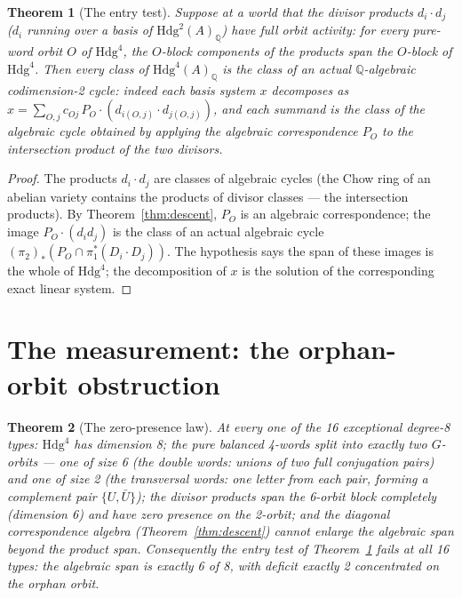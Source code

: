\documentclass[11pt]{article}
\newtheorem{theorem}{Theorem}
\begin{document}
\begin{theorem}[The entry test]\label{thm:entry}
Suppose at a world that the divisor products $d_i \cdot d_j$ ($d_i$ running over a basis of
$\mathrm{Hdg}^2(A)_\mathbb{Q}$) have \emph{full orbit activity}: for every pure-word orbit $O$
of $\mathrm{Hdg}^4$, the $O$-block components of the products span the $O$-block of
$\mathrm{Hdg}^4$.  Then every class of $\mathrm{Hdg}^4(A)_\mathbb{Q}$ is the class of an actual
$\mathbb{Q}$-algebraic codimension-2 cycle: indeed each basis system $x$ decomposes as
$x = \sum_{O,j} c_{Oj}\, P_O \cdot (d_{i(O,j)} \cdot d_{j(O,j)})$, and each summand is the class
of the algebraic cycle obtained by applying the algebraic correspondence $P_O$ to the
intersection product of the two divisors.
\end{theorem}

\begin{proof}
The products $d_i \cdot d_j$ are classes of algebraic cycles (the Chow ring of an abelian
variety contains the products of divisor classes --- the intersection products).  By
Theorem~\ref{thm:descent}, $P_O$ is an algebraic correspondence; the image
$P_O \cdot (d_i d_j)$ is the class of an actual algebraic cycle
$(\pi_2)_*(P_O \cap \pi_1^*(D_i \cdot D_j))$.  The hypothesis says the span of these images is
the whole of $\mathrm{Hdg}^4$; the decomposition of $x$ is the solution of the corresponding
exact linear system.
\end{proof}

\section{The measurement: the orphan-orbit obstruction}

\begin{theorem}[The zero-presence law]\label{thm:zero}
At every one of the 16 exceptional degree-8 types: $\mathrm{Hdg}^4$ has dimension 8; the pure
balanced 4-words split into exactly two $G$-orbits --- one of size 6 (the \emph{double} words:
unions of two full conjugation pairs) and one of size 2 (the \emph{transversal} words: one
letter from each pair, forming a complement pair $\{U, \bar U\}$); the divisor products span
the 6-orbit block completely (dimension 6) and have \emph{zero} presence on the 2-orbit; and the
diagonal correspondence algebra (Theorem~\ref{thm:descent}) cannot enlarge the algebraic span
beyond the product span.  Consequently the entry test of Theorem~\ref{thm:entry} fails at all
16 types: the algebraic span is exactly 6 of 8, with deficit exactly 2 concentrated on the
orphan orbit.
\end{theorem}
\end{document}
